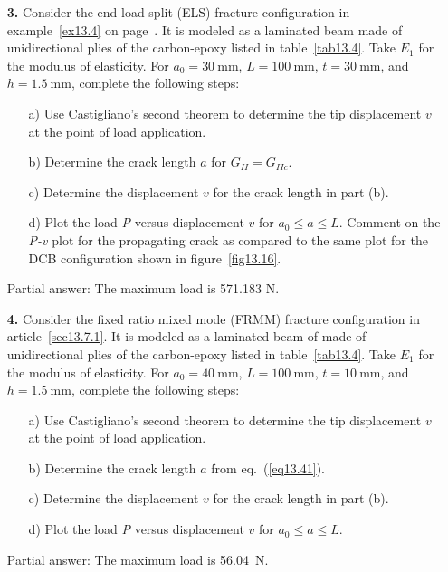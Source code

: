 \documentclass{AeroStructure-ERJohnson}
\begin{document}
\begin{exercise}
\begin{enumerate}[\textbf{2.}]
\item[\textbf{3.}]  Consider the end load split (ELS) fracture configuration in example~\ref{ex13.4} on page~\pageref{ex13.4}. It is modeled as a laminated beam made of unidirectional plies of the carbon-epoxy listed in table~\ref{tab13.4}. Take $\textit{E}_1$ for the modulus of elasticity. For $a_{0}=30 \mathrm{~mm}$, $L=100 \mathrm{~mm}$, $t=30 \mathrm{~mm}$, and $h=1.5 \mathrm{~mm}$, complete the following steps:
\begin{enumerate}[b)]
\item[{\hskip13pt}a)] Use Castigliano's second theorem to determine the tip displacement $v$ at the point of load application.
\item[{\hskip13pt}b)] Determine the crack length $a$ for $G_{I I}=G_{I I c}$.
\item[{\hskip13pt}c)] Determine the displacement $v$ for the crack length in part (b).
\item[{\hskip13pt}d)] Plot the load \textit{P} versus displacement $v$ for $a_{0} \leq a \leq L$. Comment on the \textit{P-v} plot for the propagating crack as compared to the same plot for the DCB configuration shown in figure~\ref{fig13.16}.
\end{enumerate}
Partial answer: The maximum load is 571.183 N.

\item[\textbf{4.}] Consider the fixed ratio mixed mode (FRMM) fracture configuration in article~\ref{sec13.7.1}. It is modeled as a laminated beam of made of unidirectional plies of the carbon-epoxy listed in table~\ref{tab13.4}. Take $E_1$ for the modulus of elasticity. For $a_{0}=40 \mathrm{~mm}$, $L=100 \mathrm{~mm}$, $t=10 \mathrm{~mm}$, and $h=1.5 \mathrm{~mm}$, complete the following steps:
\begin{enumerate}[b)]
\item[{\hskip13pt}a)] Use Castigliano's second theorem to determine the tip displacement $v$ at the point of load application.
\item[{\hskip13pt}b)]  Determine the crack length $a$ from eq.~(\ref{eq13.41}).
\item[{\hskip13pt}c)]  Determine the displacement $v$ for the crack length in part (b).
\item[{\hskip13pt}d)]  Plot the load \textit{P} versus displacement $v$ for $a_{0} \leq a \leq L$.
\end{enumerate}
Partial answer: The maximum load is 56.04~N.
\end{enumerate}
\end{exercise}
\end{document}
